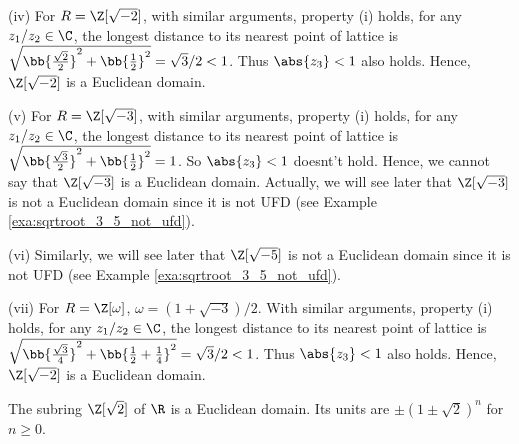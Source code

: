 \begin{example}
\item [(iv)] For $R = \Z[\sqrt{-2}]$, with similar arguments, property (i) holds, for any $z_1/z_2 \in \C$, the longest distance to its nearest point of lattice is $\sqrt{\bb{\frac {\sqrt{2}}2}^2 + \bb{\frac 12}^2} = \sqrt{3}/2 < 1$. Thus $\abs{z_3}<1$ also holds. Hence, $\Z[\sqrt{-2}]$ is a Euclidean domain.

\item [(v)] For $R = \Z[\sqrt{-3}]$, with similar arguments, property (i) holds, for any $z_1/z_2 \in \C$, the longest distance to its nearest point of lattice is $\sqrt{\bb{\frac {\sqrt{3}}2}^2 + \bb{\frac 12}^2} = 1$. So $\abs{z_3}<1$ doesnt't hold. Hence, we cannot say that $\Z[\sqrt{-3}]$ is a Euclidean domain. Actually, we will see later that $\Z[\sqrt{-3}]$ is not a Euclidean domain since it is not UFD (see Example \ref{exa:sqrtroot_3_5_not_ufd}).

\item [(vi)] Similarly, we will see later that $\Z[\sqrt{-5}]$ is not a Euclidean domain since it is not UFD (see Example \ref{exa:sqrtroot_3_5_not_ufd}).

\item [(vii)] For $R = \Z[\omega]$, $\omega = (1+ \sqrt{-3})/2$. With similar arguments, property (i) holds, for any $z_1/z_2 \in \C$, the longest distance to its nearest point of lattice is $\sqrt{\bb{\frac {\sqrt{3}}4}^2 + \bb{\frac 12 + \frac 14}^2} = \sqrt{3}/2 < 1$. Thus $\abs{z_3}<1$ also holds. Hence, $\Z[\sqrt{-2}]$ is a Euclidean domain.
\een
\end{example}


\begin{proposition}
The subring $\Z[\sqrt{2}]$ of $\R$ is a Euclidean domain. Its units are $\pm(1\pm \sqrt{2})^n$ for $n \geq 0$.
\end{proposition}

